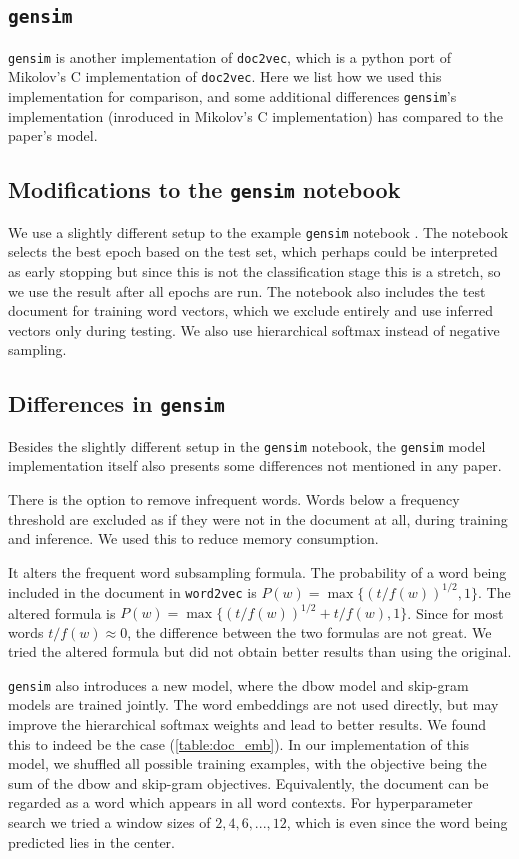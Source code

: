 \documentclass{article}
\begin{document}
\begin{appendices}
\section{\texttt{gensim}} \label{sec:gensim}
\texttt{gensim} is another implementation of \texttt{doc2vec}, which is a python port of Mikolov's C implementation of \texttt{doc2vec}. Here we list how we used this implementation for comparison, and some additional differences \texttt{gensim}'s implementation (inroduced in Mikolov's C implementation) has compared to the paper's model.

\subsection{Modifications to the \texttt{gensim} notebook}
We use a slightly different setup to the example \texttt{gensim} notebook \citep{mohr_gensim_2017}. The notebook selects the best epoch based on the test set, which perhaps could be interpreted as early stopping but since this is not the classification stage this is a stretch, so we use the result after all epochs are run. The notebook also includes the test document for training word vectors, which we exclude entirely and use inferred vectors only during testing. We also use hierarchical softmax instead of negative sampling.

\subsection{Differences in \texttt{gensim}}
Besides the slightly different setup in the \texttt{gensim} notebook, the \texttt{gensim} model implementation itself also presents some differences not mentioned in any paper.

There is the option to remove infrequent words. Words below a frequency threshold are excluded as if they were not in the document at all, during training and inference. We used this to reduce memory consumption.

It alters the frequent word subsampling formula. The probability of a word being included in the document in \texttt{word2vec} is $P(w)=\max\{(t/f(w))^{1/2}, 1\}$. The altered formula is $P(w)=\max\{(t/f(w))^{1/2} + {t/f(w)}, 1\}$. Since for most words $t/f(w)\approx 0$, the difference between the two formulas are not great. We tried the altered formula but did not obtain better results than using the original.

\texttt{gensim} also introduces a new model, where the dbow model and skip-gram models are trained jointly. The word embeddings are not used directly, but may improve the hierarchical softmax weights and lead to better results. We found this to indeed be the case (\autoref{table:doc_emb}). In our implementation of this model, we shuffled all possible training examples, with the objective being the sum of the dbow and skip-gram objectives. Equivalently, the document can be regarded as a word which appears in all word contexts. For hyperparameter search we tried a window sizes of $2, 4, 6, ..., 12$, which is even since the word being predicted lies in the center.


\end{appendices}
\end{document}
